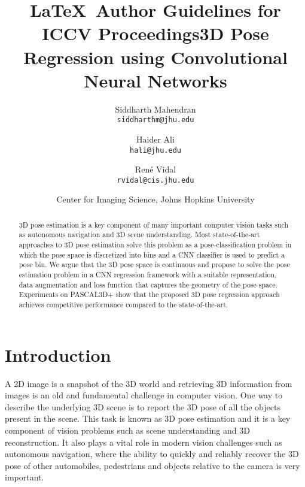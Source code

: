 \documentclass[10pt,twocolumn,letterpaper]{article}
\begin{document}
	
	\title{\LaTeX\ Author Guidelines for ICCV Proceedings}
	
	\title{3D Pose Regression using Convolutional Neural Networks}
	
	\author{Siddharth Mahendran \\
		{\tt\small siddharthm@jhu.edu}
		\and
		Haider Ali \\
		{\tt\small hali@jhu.edu}
		\and
		Ren{\'e} Vidal \\
		{\tt\small rvidal@cis.jhu.edu}
		\and
		Center for Imaging Science, Johns Hopkins University
		\vspace{-2mm}
	}
	
	\maketitle
	
	
	\begin{abstract}
		3D pose estimation is a key component of many important computer vision tasks such as autonomous navigation and 3D scene understanding. Most state-of-the-art approaches to 3D pose estimation solve this problem as a pose-classification problem in which the pose space is discretized into bins and a CNN classifier is used to predict a pose bin. We argue that the 3D pose space is continuous and propose to solve the pose estimation problem in a CNN regression framework with a suitable representation, data augmentation and loss function that captures the geometry of the pose space. Experiments on PASCAL3D+ show that the proposed 3D pose regression approach achieves competitive performance compared to the state-of-the-art.
	\end{abstract}
	
	\section{Introduction}
	\label{sec:intro}
	A 2D image is a snapshot of the 3D world and retrieving 3D information from images is an old and fundamental challenge in computer vision. One way to describe the underlying 3D scene is to report the 3D pose of all the objects present in the scene. This task is known as 3D pose estimation and it is a key component of vision problems such as scene understanding and 3D reconstruction. It also plays a vital role in modern vision challenges such as autonomous navigation, where the ability to quickly and reliably recover the 3D pose of other automobiles, pedestrians and objects relative to the camera is very important. 
	
\end{document}
